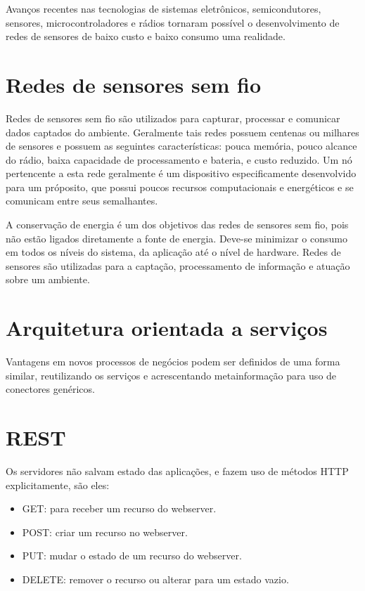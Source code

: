 Avan\c{c}os recentes nas tecnologias de sistemas eletr\^onicos, semicondutores, sensores, microcontroladores e r\'adios tornaram poss\'ivel o desenvolvimento de redes de sensores de baixo custo e baixo consumo uma realidade.
\section{Redes de sensores sem fio}

Redes de sensores sem fio s\~ao utilizados para capturar, processar e comunicar dados captados do ambiente. Geralmente tais redes possuem centenas ou milhares de sensores e possuem as seguintes caracter\'isticas: pouca mem\'oria, pouco alcance do r\'adio, baixa capacidade de processamento e bateria, e custo reduzido. Um n\'o pertencente a esta rede geralmente \'e um dispositivo especificamente desenvolvido para um pr\'oposito, que possui poucos recursos computacionais e energ\'eticos e se comunicam entre seus semalhantes.

A conserva\c{c}\~ao de energia \'e um dos objetivos das redes de sensores sem fio, pois n\~ao est\~ao ligados diretamente a fonte de energia. Deve-se minimizar o consumo em todos os n\'iveis do sistema, da aplica\c{c}\~ao at\'e o n\'ivel de hardware. Redes de sensores s\~ao utilizadas para a capta\c{c}\~ao, processamento de informa\c{c}\~ao e atua\c{c}\~ao sobre um ambiente.


\section{Arquitetura orientada a servi\c{c}os}
Vantagens em novos processos de neg\'ocios podem ser definidos de uma forma similar, reutilizando os servi\c{c}os e acrescentando metainforma\c{c}\~ao para uso de conectores gen\'ericos.
\cite{perrey2003service}


\section{REST}

Os servidores n\~ao salvam estado das aplica\c{c}\~oes, e fazem uso de m\'etodos HTTP explicitamente, s\~ao eles:
\begin{itemize}
    \item GET: para receber um recurso do webserver.
    \item POST: criar um recurso no webserver.
    \item PUT: mudar o estado de um recurso do webserver.
    \item DELETE: remover o recurso ou alterar para um estado vazio.
\end{itemize}

